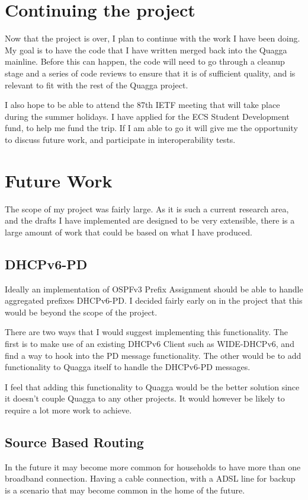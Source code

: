 \documentclass[12pt]{report}
\begin{document}
\section{Continuing the project}
Now that the project is over, I plan to continue with the work I have been
doing.  My goal is to have the code that I have written merged back into the
Quagga mainline. Before this can happen, the code will need to go through a
cleanup stage and a series of code reviews to ensure that it is of sufficient
quality, and is relevant to fit with the rest of the Quagga project.

I also hope to be able to attend the 87th IETF meeting that will take place
during the summer holidays. I have applied for the ECS Student Development
fund, to help me fund the trip. If I am able to go it will give me the
opportunity to discuss future work, and participate in interoperability tests.

\section{Future Work}
The scope of my project was fairly large. As it is such a current research
area, and the drafts I have implemented are designed to be very extensible,
there is a large amount of work that could be based on what I have produced. 

\subsection{DHCPv6-PD}
Ideally an implementation of OSPFv3 Prefix Assignment should be able to handle
aggregated prefixes DHCPv6-PD\@. I decided fairly early on in the project that
this would be beyond the scope of the project. 

There are two ways that I would suggest implementing this functionality. The
first is to make use of an existing DHCPv6 Client such as WIDE-DHCPv6, and find
a way to hook into the PD message functionality. The other would be to add
functionality to Quagga itself to handle the DHCPv6-PD messages. 

I feel that adding this functionality to Quagga would be the better solution
since it doesn't couple Quagga to any other projects. It would however be
likely to require a lot more work to achieve.

\subsection{Source Based Routing}
In the future it may become more common for households to have more than one
broadband connection. Having a cable connection, with a ADSL line for backup is
a scenario that may become common in the home of the future. 
\end{document}
